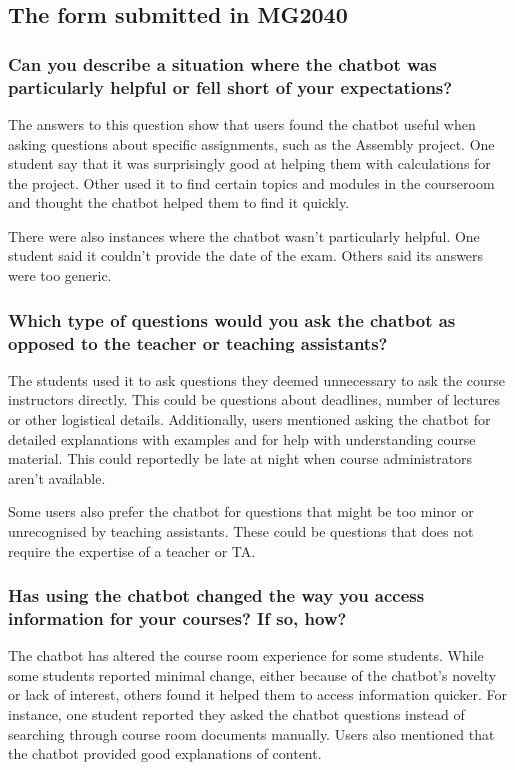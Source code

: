 \subsection{The form submitted in MG2040}


\subsubsection{Can you describe a situation where the chatbot was particularly helpful or fell short of your expectations?}


The answers to this question show that users found the chatbot useful when asking questions about specific assignments, such as the Assembly project. One student say that it was surprisingly good at helping them with calculations for the project. Other used it to find certain topics and modules in the courseroom and thought the chatbot helped them to find it quickly.


There were also instances where the chatbot wasn’t particularly helpful. One student said it couldn’t provide the date of the exam. Others said its answers were too generic.


\subsubsection{Which type of questions would you ask the chatbot as opposed to the teacher or teaching assistants?}


The students used it to ask questions they deemed unnecessary to ask the course instructors directly. This could be questions about deadlines, number of lectures or other logistical details. Additionally, users mentioned asking the chatbot for detailed explanations with examples and for help with understanding course material. This could reportedly be late at night when course administrators aren’t available.


Some users also prefer the chatbot for questions that might be too minor or unrecognised by teaching assistants. These could be questions that does not require the expertise of a teacher or TA.


\subsubsection{Has using the chatbot changed the way you access information for your courses? If so, how?}


The chatbot has altered the course room experience for some students. While some students reported minimal change, either because of the chatbot's novelty or lack of interest, others found it helped them to access information quicker. For instance, one student reported they asked the chatbot questions instead of searching through course room documents manually. Users also mentioned that the chatbot provided good explanations of content.


